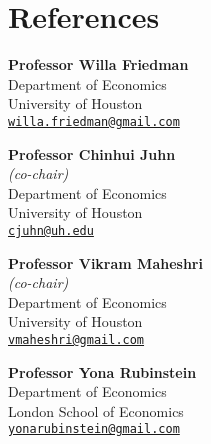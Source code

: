 \documentclass[10pt,letterpaper]{article}
\begin{document}
\section*{References}

\begin{minipage}[t]{0.45\textwidth}
   \textbf{Professor Willa Friedman}  \\
                   Department of Economics \\
                   University of Houston  \\
                   \href{mailto:willa.friedman@gmail.com}{\tt willa.friedman@gmail.com} \\
\end{minipage}
\begin{minipage}[t]{0.45\textwidth}
  \textbf{Professor Chinhui Juhn}  \\
  \textit{(co-chair)}  \\
                   Department of Economics \\
                   University of Houston  \\
                   \href{mailto:cjuhn@uh.edu}{\tt cjuhn@uh.edu} \\
\end{minipage}

\begin{minipage}[t]{0.45\textwidth}
   \textbf{Professor Vikram Maheshri}  \\
   \textit{(co-chair)}  \\
                   Department of Economics \\
                   University of Houston  \\
                   \href{mailto:vmaheshri@gmail.com}{\tt vmaheshri@gmail.com} \\
\end{minipage}
\begin{minipage}[t]{0.45\textwidth}
   \textbf{Professor Yona Rubinstein}  \\
                   Department of Economics \\
                   London School of Economics  \\
                   \href{mailto:yonarubinstein@gmail.com}{\tt yonarubinstein@gmail.com} \\
\end{minipage}

\end{document}
